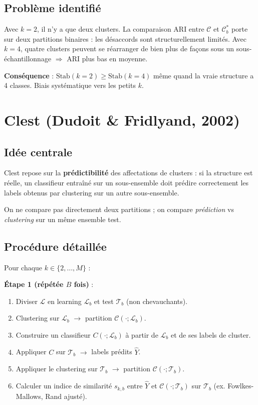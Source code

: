 \documentclass[11pt, a4paper]{article}
\begin{document}
\subsection{Problème identifié}

Avec $k=2$, il n'y a que deux clusters. La comparaison ARI entre $\mathcal{C}$ et $\mathcal{C}_b^*$ porte sur deux partitions binaires : les désaccords sont structurellement limités. Avec $k=4$, quatre clusters peuvent se réarranger de bien plus de façons sous un sous-échantillonnage $\Rightarrow$ ARI plus bas en moyenne.

\textbf{Conséquence} : $\text{Stab}(k=2) \geq \text{Stab}(k=4)$ même quand la vraie structure a 4 classes. Biais systématique vers les petits $k$.

\section{Clest (Dudoit \& Fridlyand, 2002)}
\label{sec:clest}

\subsection{Idée centrale}

Clest repose sur la \textbf{prédictibilité} des affectations de clusters : si la structure est réelle, un classifieur entraîné sur un sous-ensemble doit prédire correctement les labels obtenus par clustering sur un autre sous-ensemble.

On ne compare pas directement deux partitions ; on compare \emph{prédiction} vs \emph{clustering} sur un même ensemble test.

\subsection{Procédure détaillée}

Pour chaque $k \in \{2, \ldots, M\}$ :

\textbf{Étape 1 (répétée $B$ fois)} :
\begin{enumerate}
  \item Diviser $\mathcal{L}$ en learning $\mathcal{L}_b$ et test $\mathcal{T}_b$ (non chevauchants).
  \item Clustering sur $\mathcal{L}_b$ $\to$ partition $\mathcal{C}(\cdot; \mathcal{L}_b)$.
  \item Construire un classifieur $C(\cdot; \mathcal{L}_b)$ à partir de $\mathcal{L}_b$ et de ses labels de cluster.
  \item Appliquer $C$ sur $\mathcal{T}_b$ $\to$ labels prédits $\hat{Y}$.
  \item Appliquer le clustering sur $\mathcal{T}_b$ $\to$ partition $\mathcal{C}(\cdot; \mathcal{T}_b)$.
  \item Calculer un indice de similarité $s_{k,b}$ entre $\hat{Y}$ et $\mathcal{C}(\cdot; \mathcal{T}_b)$ sur $\mathcal{T}_b$ (ex. Fowlkes-Mallows, Rand ajusté).
\end{enumerate}
\end{document}
